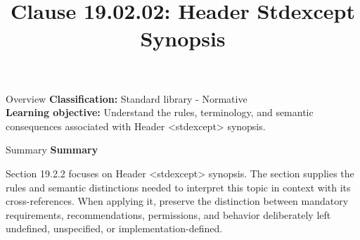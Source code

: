 \documentclass[10pt,letterpaper]{article}
\title{Clause 19.02.02: Header Stdexcept Synopsis}
\author{}
\date{}
\begin{document}
\maketitle
\begin{CornellOverviewBox}{Overview}
\textbf{Classification:} Standard library - Normative\\[2pt]
\textbf{Learning objective:} Understand the rules, terminology, and semantic consequences associated with Header <stdexcept> synopsis.
\end{CornellOverviewBox}\begin{CornellSummaryBox}{Summary}
{\sffamily\bfseries\color{Accent} Summary}\par\vspace{3pt}Section 19.2.2 focuses on Header <stdexcept> synopsis. The section supplies the rules and semantic distinctions needed to interpret this topic in context with its cross-references. When applying it, preserve the distinction between mandatory requirements, recommendations, permissions, and behavior deliberately left undefined, unspecified, or implementation-defined.
\end{CornellSummaryBox}
\end{document}
